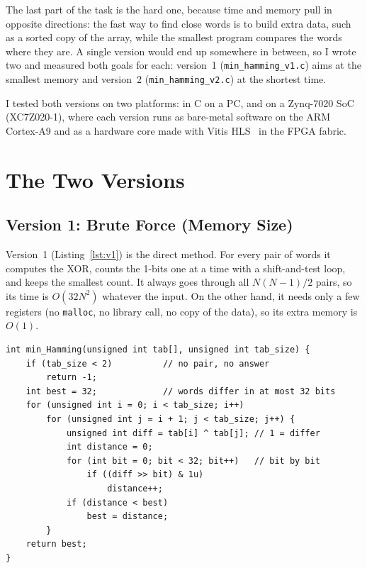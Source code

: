 \documentclass[conference,a4paper]{IEEEtran}
\newcommand{\code}[1]{\texttt{#1}}
\begin{document}
The last part of the task is the hard one, because time and memory pull in
opposite directions: the fast way to find close words is to build extra data,
such as a sorted copy of the array, while the smallest program compares the
words where they are. A single version would end up somewhere in between, so I
wrote two and measured both goals for each: version~1
(\code{min\_hamming\_v1.c}) aims at the smallest memory and version~2
(\code{min\_hamming\_v2.c}) at the shortest time.

I tested both versions on two platforms: in C on a PC, and on a Zynq-7020 SoC
(XC7Z020-1), where each version runs as bare-metal software on the ARM
Cortex-A9 and as a hardware core made with Vitis HLS~\cite{ug1399} in the FPGA
fabric.

\section{The Two Versions}

\subsection{Version 1: Brute Force (Memory Size)}
Version~1 (Listing~\ref{lst:v1}) is the direct method. For every pair of words
it computes the XOR, counts the 1-bits one at a time with a shift-and-test loop,
and keeps the smallest count. It always goes through all $N(N-1)/2$ pairs, so
its time is $O(32N^2)$ whatever the input. On the other hand, it needs only a
few registers (no \code{malloc}, no library call, no copy of the data), so its
extra memory is $O(1)$.

\begin{lstlisting}[float=t,caption={min\_hamming\_v1.c (comments shortened)},label={lst:v1}]
int min_Hamming(unsigned int tab[], unsigned int tab_size) {
    if (tab_size < 2)          // no pair, no answer
        return -1;
    int best = 32;             // words differ in at most 32 bits
    for (unsigned int i = 0; i < tab_size; i++)
        for (unsigned int j = i + 1; j < tab_size; j++) {
            unsigned int diff = tab[i] ^ tab[j]; // 1 = differ
            int distance = 0;
            for (int bit = 0; bit < 32; bit++)   // bit by bit
                if ((diff >> bit) & 1u)
                    distance++;
            if (distance < best)
                best = distance;
        }
    return best;
}
\end{lstlisting}
\end{document}
